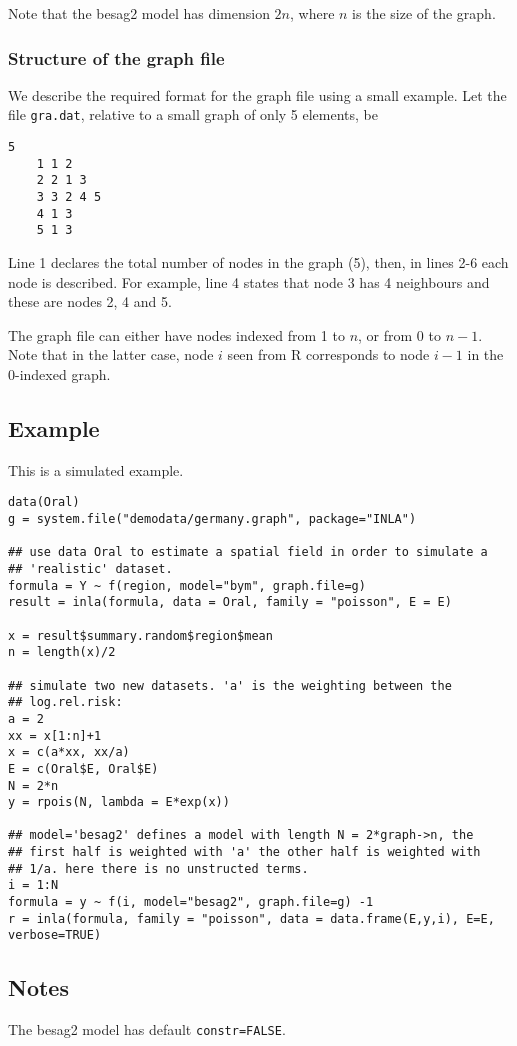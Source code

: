 \documentclass[a4paper,11pt]{article}
\begin{document}
Note that the besag2 model has dimension $2 n$, where $n$ is the
size of the graph.

\subsubsection*{Structure of the graph file}

We describe the required format for the graph file using a small
example. Let the file {\tt gra.dat}, relative to a small graph of only
5 elements, be
\begin{lstlisting}[basicstyle=\footnotesize]
    5
    1 1 2
    2 2 1 3
    3 3 2 4 5 
    4 1 3
    5 1 3
\end{lstlisting}
Line 1 declares the total number of nodes in the graph (5), then, in
lines 2-6 each node is described. For example, line 4 states that node
3 has 4 neighbours and these are nodes 2, 4 and 5.

The graph file can either have nodes indexed from 1 to $n$, or from 0
to $n-1$. Note that in the latter case, node $i$ seen from R
corresponds to node $i-1$ in the 0-indexed graph.



\subsection*{Example}

This is a simulated example.

\begin{verbatim}
data(Oral)
g = system.file("demodata/germany.graph", package="INLA")

## use data Oral to estimate a spatial field in order to simulate a
## 'realistic' dataset.
formula = Y ~ f(region, model="bym", graph.file=g)
result = inla(formula, data = Oral, family = "poisson", E = E)

x = result$summary.random$region$mean
n = length(x)/2

## simulate two new datasets. 'a' is the weighting between the
## log.rel.risk:
a = 2
xx = x[1:n]+1
x = c(a*xx, xx/a)
E = c(Oral$E, Oral$E)
N = 2*n
y = rpois(N, lambda = E*exp(x))

## model='besag2' defines a model with length N = 2*graph->n, the
## first half is weighted with 'a' the other half is weighted with
## 1/a. here there is no unstructed terms.
i = 1:N
formula = y ~ f(i, model="besag2", graph.file=g) -1
r = inla(formula, family = "poisson", data = data.frame(E,y,i), E=E, verbose=TRUE)
\end{verbatim}


\subsection*{Notes}

The besag2 model has default \texttt{constr=FALSE}. 
\end{document}
